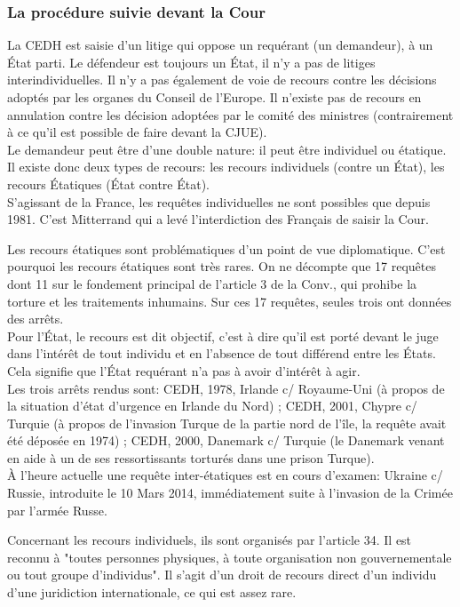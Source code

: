 \documentclass[10pt, a4paper, openany]{book}
\begin{document}
\subsubsection{La procédure suivie devant la Cour}

La CEDH est saisie d'un litige qui oppose un requérant (un demandeur), à un État parti. Le défendeur est toujours un État, il n'y a pas de litiges interindividuelles. Il n'y a pas également de voie de recours contre les décisions adoptés par les organes du Conseil de l'Europe. Il n'existe pas de recours en annulation contre les décision adoptées par le comité des ministres (contrairement à ce qu'il est possible de faire devant la CJUE). \\
Le demandeur peut être d'une double nature: il peut être individuel ou étatique. Il existe donc deux types de recours: les recours individuels (contre un État), les recours Étatiques (État contre État). \\
S'agissant de la France, les requêtes individuelles ne sont possibles que depuis 1981. C'est Mitterrand qui a levé l'interdiction des Français de saisir la Cour.


Les recours étatiques sont problématiques d'un point de vue diplomatique. C'est pourquoi les recours étatiques sont très rares. On ne décompte que 17 requêtes dont 11 sur le fondement principal de l'article 3 de la Conv., qui prohibe la torture et les traitements inhumains. Sur ces 17 requêtes, seules trois ont données des arrêts. \\
Pour l'État, le recours est dit objectif, c'est à dire qu'il est porté devant le juge dans l'intérêt de tout individu et en l'absence de tout différend entre les États. Cela signifie que l'État requérant n'a pas à avoir d'intérêt à agir. \\
Les trois arrêts rendus sont: CEDH, 1978, Irlande c/ Royaume-Uni (à propos de la situation d'état d'urgence en Irlande du Nord) ; CEDH, 2001, Chypre c/ Turquie (à propos de l'invasion Turque de la partie nord de l'île, la requête avait été déposée en 1974) ; CEDH, 2000, Danemark c/ Turquie (le Danemark venant en aide à un de ses ressortissants torturés dans une prison Turque). \\
À l'heure actuelle une requête inter-étatiques est en cours d'examen: Ukraine c/ Russie, introduite le 10 Mars 2014, immédiatement suite à l'invasion de la Crimée par l'armée Russe. 


Concernant les recours individuels, ils sont organisés par l'article 34. Il est reconnu à "toutes personnes physiques, à toute organisation non gouvernementale ou tout groupe d'individus". Il s'agit d'un droit de recours direct d'un individu d'une juridiction internationale, ce qui est assez rare. 
\end{document}
